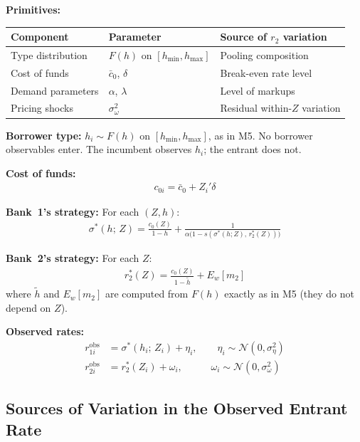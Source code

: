 \documentclass[12pt]{article}
\theoremstyle{plain}
\theoremstyle{plain}
\theoremstyle{definition}  %
\theoremstyle{remark}  %
\begin{document}
\textbf{Primitives:}
\begin{center}
\renewcommand{\arraystretch}{1.3}
\begin{tabular}{lll}
\toprule
\textbf{Component} & \textbf{Parameter} & \textbf{Source of $r_2$ variation} \\
\midrule
Type distribution & $F(h)$ on $[h_{\min}, h_{\max}]$ & Pooling composition \\
Cost of funds & $\bar{c}_0$, $\delta$ & Break-even rate level \\
Demand parameters & $\alpha$, $\lambda$ & Level of markups \\
Pricing shocks & $\sigma_\omega^2$ & Residual within-$Z$ variation \\
\bottomrule
\end{tabular}
\end{center}

\medskip\noindent
\textbf{Borrower type:} $h_i \sim F(h)$ on $[h_{\min}, h_{\max}]$, as in M5. No borrower observables enter. The incumbent observes $h_i$; the entrant does not.

\medskip\noindent
\textbf{Cost of funds:}
\begin{align}\label{eq:combined_cost}
    c_{0i} = \bar{c}_0 + Z_i'\delta
\end{align}

\medskip\noindent
\textbf{Bank~1's strategy:} For each $(Z, h)$:
\begin{align}\label{eq:combined_sigma}
    \sigma^*(h;\, Z) = \frac{c_0(Z)}{1-h} + \frac{1}{\alpha\big(1 - s(\sigma^*(h; Z),\, r_2^*(Z))\big)}
\end{align}

\textbf{Bank~2's strategy:} For each $Z$:
\begin{align}\label{eq:combined_r2}
    r_2^*(Z) = \frac{c_0(Z)}{1 - \tilde{h}} + E_{w}[m_2]
\end{align}
where $\tilde{h}$ and $E_w[m_2]$ are computed from $F(h)$ exactly as in M5 (they do not depend on $Z$).

\textbf{Observed rates:}
\begin{align}
    r_{1i}^{\text{obs}} &= \sigma^*(h_i;\, Z_i) + \eta_i, \qquad \eta_i \sim \mathcal{N}(0, \sigma_\eta^2) \label{eq:combined_r1_obs}\\
    r_{2i}^{\text{obs}} &= r_2^*(Z_i) + \omega_i, \qquad\;\;\; \omega_i \sim \mathcal{N}(0, \sigma_\omega^2) \label{eq:combined_r2_obs}
\end{align}

\subsection{Sources of Variation in the Observed Entrant Rate}
\end{document}
